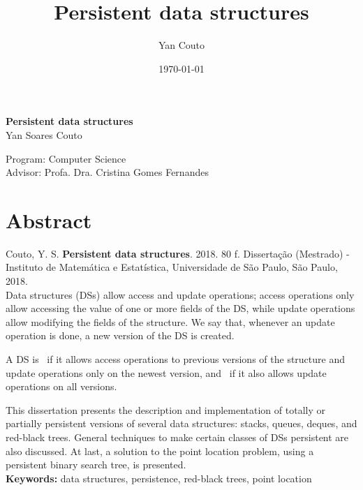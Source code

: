 \documentclass[11pt,oneside,a4paper, openany]{book}
\title{Persistent data structures}
\author{Yan Couto}
\date{\today}
\begin{document}
\frontmatter

\thispagestyle{empty}
\begin{center}
    \vspace*{2.3cm}
    \textbf{\Large{Persistent data structures}}\\

    \vspace*{1.2cm}
    \Large{Yan Soares Couto}

    \vskip 2cm

    \vskip 1.5cm
    Program: Computer Science\\
    Advisor: Profa. Dra. Cristina Gomes Fernandes

    \vskip 1cm

    \vskip 0.5cm
\end{center}


\chapter*{Abstract}
\noindent Couto, Y. S. \textbf{Persistent data structures}. 
2018. 80 f.
Dissertação (Mestrado) - Instituto de Matemática e Estatística,
Universidade de São Paulo, São Paulo, 2018.
\\

Data structures (DSs) allow access and update operations; access operations only allow accessing the value of one or more fields of the DS, while update operations allow modifying the fields of the structure. We say that, whenever an update operation is done, a new version of the DS is created.

A DS is~ if it allows access operations to previous versions of the structure and update operations only on the newest version, and~ if it also allows update operations on all versions.

This dissertation presents the description and implementation of totally or partially persistent versions of several data structures: stacks, queues, deques, and red-black trees. General techniques to make certain classes of DSs persistent are also discussed. At last, a solution to the point location problem, using a persistent binary search tree, is presented.
\\

\noindent \textbf{Keywords:} data structures, persistence, red-black trees, point location
\end{document}
